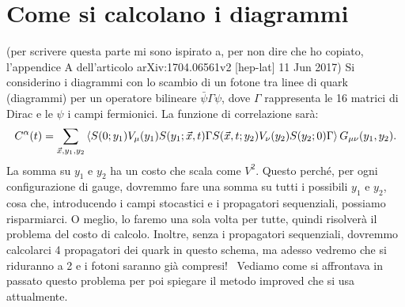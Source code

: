 \documentclass[LaM]{sapthesis}
\begin{document}
	\chapter{Come si calcolano i diagrammi}
	\color{green}(per scrivere questa parte mi sono ispirato a, per non dire che ho copiato, l'appendice A dell'articolo arXiv:1704.06561v2 [hep-lat] 11 Jun 2017)\color{black} Si considerino i diagrammi con lo scambio di un fotone tra linee di quark \color{blue}(diagrammi)\color{black} per un operatore bilineare $\bar{\psi}\Gamma\psi$, dove $\Gamma$ rappresenta le 16 matrici di Dirac e le $\psi$ i campi fermionici. La funzione di correlazione sarà:
	\begin{equation}
		C^\alpha(t)=\sum_{\vec{x},y_1,y_2}\braket{S(0;y_1)V_\mu(y_1)S(y_1;\vec{x},t)\Gamma S(\vec{x},t;y_2)V_\nu(y_2)S(y_2;0)\Gamma}G_{\mu\nu}(y_1,y_2).
	\end{equation}
	La somma su $y_1$ e $y_2$ ha un costo che scala come $V^2$. \color{red}Questo perché, per ogni configurazione di gauge, dovremmo fare una somma su tutti i possibili $y_1$ e $y_2$, cosa che, introducendo i campi stocastici e i propagatori sequenziali, possiamo risparmiarci. O meglio, lo faremo una sola volta per tutte, quindi risolverà il problema del costo di calcolo. Inoltre, senza i propagatori sequenziali, dovremmo calcolarci 4 propagatori dei quark in questo schema, ma adesso vedremo che si riduranno a 2 e i fotoni saranno già compresi!\color{black} \ Vediamo come si affrontava in passato questo problema per poi spiegare il metodo improved che si usa attualmente.
	
\end{document}
